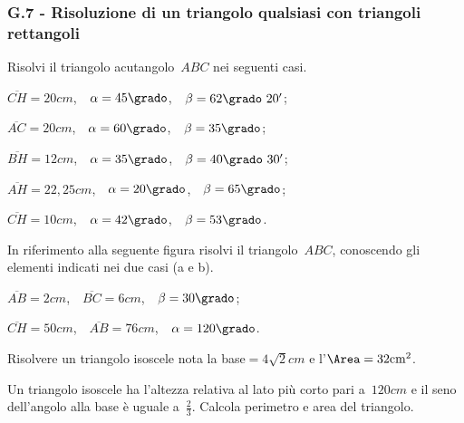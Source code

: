 \subsubsection*{G.7 - Risoluzione di un triangolo qualsiasi con triangoli rettangoli}

\begin{esercizio}
\label{ese:G.22}
Risolvi il triangolo acutangolo~$ABC$ nei seguenti casi.
\begin{multicols}{2}
\begin{enumeratea}
\item $\overline{CH}=20\unit{cm}$,~~$\alpha=45\grado$,~~$\beta=62\grado~20'$;
\item $\overline{AC}=20\unit{cm}$,~~$\alpha=60\grado$,~~$\beta=35\grado$;
\item $\overline{BH}=12\unit{cm}$,~~$\alpha=35\grado$,~~$\beta=40\grado~30'$;
\item $\overline{AH}=22,25\unit{cm}$,~~$\alpha=20\grado$,~~$\beta=65\grado$;
\item $\overline{CH}=10\unit{cm}$,~~$\alpha=42\grado$,~~$\beta=53\grado$.
\end{enumeratea}
\end{multicols}
\end{esercizio}

\begin{esercizio}
\label{ese:G.23}
In riferimento alla seguente figura risolvi il triangolo~$ABC$, conoscendo gli elementi indicati nei due casi (a e b).
\begin{center}
  
\end{center}
\begin{multicols}{2}
 \begin{enumeratea}
\item $\overline{AB}=2\unit{cm}$,~~$\overline{BC}=6\unit{cm}$,~~$\beta=30\grado$;
\item $\overline{CH}=50\unit{cm}$,~~$\overline{AB}=76\unit{cm}$,~~$\alpha=120\grado$.
\end{enumeratea}
\end{multicols}
\end{esercizio}

\begin{multicols}{2}
\begin{esercizio}
\label{ese:G.24}
Risolvere un triangolo isoscele nota la base$=4\sqrt{2}\unit{cm}$ e l'$\Area=32\unit{cm^2}$.
\end{esercizio}

\begin{esercizio}
\label{ese:G.25}
Un triangolo isoscele ha l'altezza relativa al lato più corto pari a~$120\unit{cm}$ e il seno dell'angolo alla base è uguale a~$\frac{2}{3}$.
Calcola perimetro e area del triangolo.
\end{esercizio}
\end{multicols}

